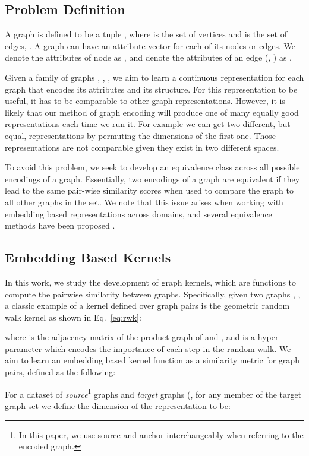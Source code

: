 \documentclass[sigconf]{acmart}
\begin{document}
\subsection{Problem Definition}

A graph is defined to be a tuple , where  is the set of vertices and  is the set of edges, .
A graph  can have an attribute vector  for each of its nodes or edges.
We denote the attributes of node  as , and denote the attributes of an edge (, ) as .

Given a family of graphs {, , , } we aim to learn a continuous representation for each graph  that encodes its attributes and its structure.
For this representation to be useful, it has to be comparable to other graph representations.
However, it is likely that our method of graph encoding will produce one of many equally good representations each time we run it.
For example we can get two different, but equal, representations by permuting the dimensions of the first one.
Those representations are not comparable given they exist in two different spaces.

To avoid this problem, we seek to develop an equivalence class across all possible encodings of a graph.
Essentially, two encodings of a graph are equivalent if they lead to the same pair-wise similarity scores when used to compare the graph to all other graphs in the set.
We note that this issue arises when working with embedding based representations across domains, and several equivalence methods have been proposed \cite{D16-1250,NIPS2018_7368}.

\subsection{Embedding Based Kernels}
In this work, we study the development of graph kernels, which are functions to compute the pairwise similarity between graphs.
Specifically, given two graphs , , a classic example of a kernel defined over graph pairs is the geometric random walk kernel \cite{borgwardt2005protein} as shown in Eq.\ \ref{eq:rwk}:

where  is the adjacency matrix of the product graph of  and , and  is a hyper-parameter which encodes the importance of each step in the random walk.
We aim to learn an embedding based kernel function  as a similarity metric for graph pairs, defined as the following:

For a dataset of  \emph{source}\footnote{In this paper, we use source and anchor interchangeably when referring to the encoded graph.} graphs  and  \emph{target} graphs (, for any member of the target graph set we define the  dimension of the representation  to be:
\end{document}
